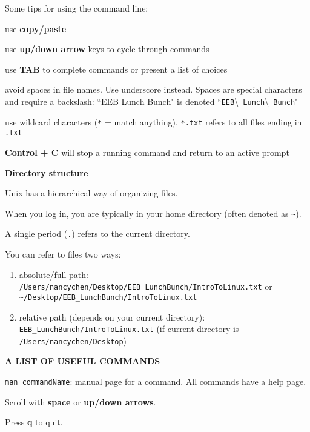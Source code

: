 \documentclass[11pt]{article}
\begin{document}
Some tips for using the command line:
\begin{itemize*}
\item use \textbf{copy/paste}
\item use \textbf{up/down arrow} keys to cycle through commands
\item use \textbf{TAB} to complete commands or present a list of choices
\item avoid spaces in file names. Use underscore instead. Spaces are special characters and require a backslash: ``EEB Lunch Bunch" is denoted ``\texttt{EEB}\textbackslash\texttt{ Lunch}\textbackslash\texttt{ Bunch}"
\item use wildcard characters (\texttt{*} = match anything). \texttt{*.txt} refers to all files ending in \texttt{.txt}
\item \textbf{Control + C} will stop a running command and return to an active prompt
\end{itemize*}

\textbf{Directory structure}

Unix has a hierarchical way of organizing files.

When you log in, you are typically in your home directory (often denoted as \texttt{\~{}}).

A single period (\texttt{.}) refers to the current directory.

You can refer to files two ways:
\begin{enumerate}
\item absolute/full path:\\ 
\texttt{/Users/nancychen/Desktop/EEB\_LunchBunch/IntroToLinux.txt} or\\
\texttt{\~{}/Desktop/EEB\_LunchBunch/IntroToLinux.txt}
\item relative path (depends on your current directory):\\
 \texttt{EEB\_LunchBunch/IntroToLinux.txt} (if current directory is \texttt{/Users/nancychen/Desktop})\\
\end{enumerate}


\textbf{A LIST OF USEFUL COMMANDS}

\texttt{man commandName}: manual page for a command. All commands have a help page. 
\vspace{-2mm}
\begin{itemize*}
\item Scroll with \textbf{space} or \textbf{up/down arrows}. 
\item Press \textbf{q} to quit.
\end{itemize*}
\end{document}
